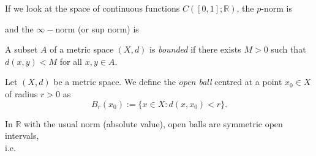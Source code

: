 \documentclass [aspectratio=169]{beamer}
\newcommand{\R}{{\mathbb{R}}}
\begin{document}
\begin{frame}
\begin{example}[$p$-norm on  {$C([0,1];\R)$} ]
If we look at the space of continuous functions $C([0,1];\R)$, the $p$-norm is 

\vspace{2.5cm}

and the $\infty-$norm (or sup norm) is 
\vspace{2cm}

\end{example}
\end{frame}

\begin{frame}
\begin{definition}
A subset $A$ of a metric space $(X,d)$ is \emph{bounded} if there exists $M>0$ such that $d(x,y) < M$ for all $x,y \in A$. 
\end{definition}
\end{frame}

\begin{frame}
\begin{definition}
Let $(X,d)$ be a metric space. We define the \emph{open ball} centred at a point $x_0 \in X$ of radius $r > 0$ as
\begin{equation*}
    B_r(x_0) := \{x \in X : d(x,x_0) < r \}.
\end{equation*}
\end{definition}

\vspace{1em}

\begin{example}
In $\R$ with the usual norm (absolute value), open balls are symmetric open intervals, \\
i.e. 
\vspace{3em}
\end{example}
\end{frame}
\end{document}
